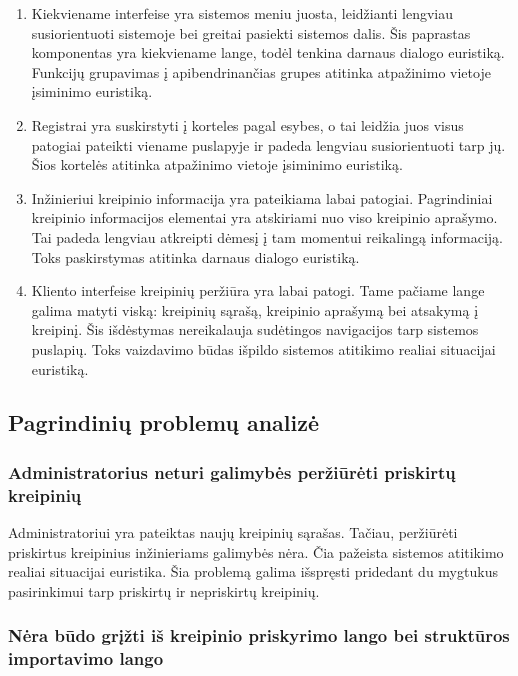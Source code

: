 	\begin{enumerate}
	\item Kiekviename interfeise yra sistemos meniu juosta, leidžianti lengviau susiorientuoti sistemoje bei greitai pasiekti sistemos dalis.
	Šis paprastas komponentas yra kiekviename lange, todėl tenkina darnaus dialogo euristiką.
	Funkcijų grupavimas į apibendrinančias grupes atitinka atpažinimo vietoje įsiminimo euristiką.
	\item Registrai yra suskirstyti į korteles pagal esybes, o tai leidžia juos visus patogiai pateikti viename puslapyje ir padeda lengviau susiorientuoti tarp jų.
	Šios kortelės atitinka atpažinimo vietoje įsiminimo euristiką.
	\item Inžinieriui kreipinio informacija yra pateikiama labai patogiai. Pagrindiniai kreipinio informacijos elementai yra atskiriami nuo viso kreipinio aprašymo.
	Tai padeda lengviau atkreipti dėmesį į tam momentui reikalingą informaciją.
	Toks paskirstymas atitinka darnaus dialogo euristiką.
	\item Kliento interfeise kreipinių peržiūra yra labai patogi.
	Tame pačiame lange galima matyti viską: kreipinių sąrašą, kreipinio aprašymą bei atsakymą į kreipinį.
	Šis išdėstymas nereikalauja sudėtingos navigacijos tarp sistemos puslapių.
	Toks vaizdavimo būdas išpildo sistemos atitikimo realiai situacijai euristiką.
	\end{enumerate}
	
\newpage
	
\subsection{Pagrindinių problemų analizė}
	
	\subsubsection{Administratorius neturi galimybės peržiūrėti priskirtų kreipinių}
		
		Administratoriui yra pateiktas naujų kreipinių sąrašas.
		Tačiau, peržiūrėti priskirtus kreipinius inžinieriams galimybės nėra.
		Čia pažeista sistemos atitikimo realiai situacijai euristika.
		Šia problemą galima išspręsti pridedant du mygtukus pasirinkimui tarp priskirtų ir nepriskirtų kreipinių.
		
	\subsubsection{Nėra būdo grįžti iš kreipinio priskyrimo lango bei struktūros importavimo lango}
	
